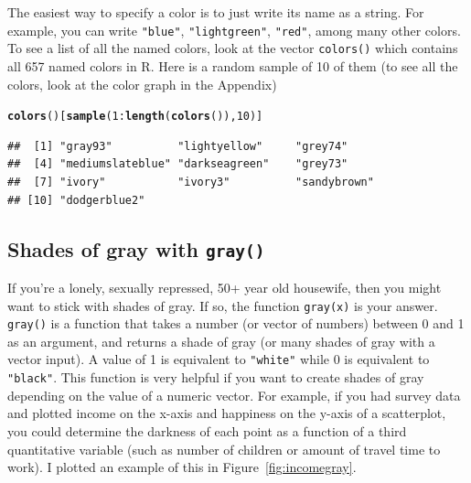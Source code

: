 \documentclass{tufte-book}\usepackage[]{graphicx}\usepackage[]{color}
\makeatletter
\newcommand{\hlnum}[1]{\textcolor[rgb]{0.686,0.059,0.569}{#1}}%
\newcommand{\hlopt}[1]{\textcolor[rgb]{0,0,0}{#1}}%
\newcommand{\hlstd}[1]{\textcolor[rgb]{0.345,0.345,0.345}{#1}}%
\newcommand{\hlkwd}[1]{\textcolor[rgb]{0.737,0.353,0.396}{\textbf{#1}}}%
\newenvironment{kframe}{%
 \def\at@end@of@kframe{}%
 \ifinner\ifhmode%
  \def\at@end@of@kframe{\end{minipage}}%
  \begin{minipage}{\columnwidth}%
 \fi\fi%
 \def\FrameCommand##1{\hskip\@totalleftmargin \hskip-\fboxsep
 \colorbox{shadecolor}{##1}\hskip-\fboxsep
     \hskip-\linewidth \hskip-\@totalleftmargin \hskip\columnwidth}%
 \MakeFramed {\advance\hsize-\width
   \@totalleftmargin\z@ \linewidth\hsize
   \@setminipage}}%
 {\par\unskip\endMakeFramed%
 \at@end@of@kframe}
\newenvironment{knitrout}{}{} %
\makeatother
\begin{document}
\begin{footnotesize}
The easiest way to specify a color is to just write its name as a string. For example, you can write \texttt{"blue"}, \texttt{"lightgreen"}, \texttt{"red"}, among many other colors. To see a list of all the named colors, look at the vector \texttt{colors()} which contains all 657 named colors in R. Here is a random sample of 10 of them (to see all the colors, look at the color graph in the Appendix)
  
\begin{footnotesize}
\begin{knitrout}
\color{fgcolor}\begin{kframe}
\begin{alltt}
\hlkwd{colors}\hlstd{()[}\hlkwd{sample}\hlstd{(}\hlnum{1}\hlopt{:}\hlkwd{length}\hlstd{(}\hlkwd{colors}\hlstd{()),} \hlnum{10}\hlstd{)]}
\end{alltt}
\begin{verbatim}
##  [1] "gray93"          "lightyellow"     "grey74"         
##  [4] "mediumslateblue" "darkseagreen"    "grey73"         
##  [7] "ivory"           "ivory3"          "sandybrown"     
## [10] "dodgerblue2"
\end{verbatim}
\end{kframe}
\end{knitrout}
\end{footnotesize}

\subsection{Shades of gray with \texttt{gray()}}
  
If you're a lonely, sexually repressed, 50+ year old housewife, then you might want to stick with shades of gray. If so, the function \texttt{gray(x)} is your answer. \texttt{gray()} is a function that takes a number (or vector of numbers) between 0 and 1 as an argument, and returns a shade of gray (or many shades of gray with a vector input). A value of 1 is equivalent to \texttt{"white"} while 0 is equivalent to \texttt{"black"}. This function is very helpful if you want to create shades of gray depending on the value of a numeric vector. For example, if you had survey data and plotted income on the x-axis and happiness on the y-axis of a scatterplot, you could determine the darkness of each point as a function of a third quantitative variable (such as number of children or amount of travel time to work). I plotted an example of this in Figure~\ref{fig:incomegray}.


\end{footnotesize}
\end{document}
